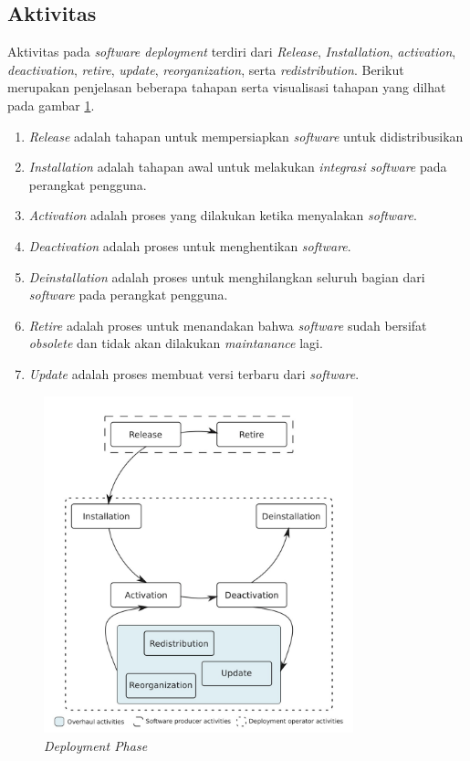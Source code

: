 \subsection{Aktivitas}

Aktivitas pada \textit{software deployment} terdiri dari
\textit{Release}, \textit{Installation}, \textit{activation}, \textit{deactivation}, \textit{retire}, \textit{update}, \textit{reorganization}, serta \textit{redistribution}. Berikut merupakan penjelasan beberapa tahapan serta visualisasi tahapan yang dilhat pada gambar \ref{fig:deployment-phase}.

\begin{enumerate}
  \item \textit{Release} adalah tahapan untuk mempersiapkan \textit{software} untuk didistribusikan
  \item \textit{Installation} adalah tahapan awal untuk melakukan \textit{integrasi} \textit{software} pada perangkat pengguna.
  \item \textit{Activation} adalah proses yang dilakukan ketika menyalakan \textit{software}.
  \item \textit{Deactivation} adalah proses untuk menghentikan \textit{software}.
  \item \textit{Deinstallation} adalah proses untuk menghilangkan seluruh bagian dari \textit{software} pada perangkat pengguna.
  \item \textit{Retire} adalah proses untuk menandakan bahwa \textit{software} sudah bersifat \textit{obsolete} dan tidak akan dilakukan \textit{maintanance} lagi.
  \item \textit{Update} adalah proses membuat versi terbaru dari \textit{software}.
\end{enumerate}

\begin{figure}[ht]
  \centering
  \includegraphics[width=0.8\textwidth]{resources/chapter-2/deployment-phase.jpg}
  \caption{\textit{Deployment Phase \parencite{ARCANGELI2015198}}}
  \label{fig:deployment-phase}
\end{figure}